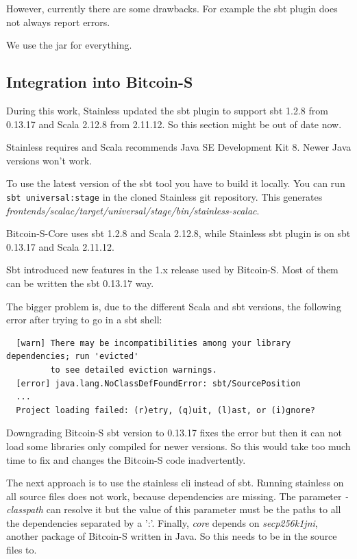\documentclass[runningheads]{llncs}
\begin{document}
However, currently there are some drawbacks.  For example the sbt
plugin does not always report errors.

We use the jar for everything. 

\subsection{Integration into Bitcoin-S}

During this work, Stainless updated the sbt plugin to support sbt
1.2.8 from 0.13.17 and Scala 2.12.8 from 2.11.12.  So this section
might be out of date now.

Stainless requires and Scala recommends Java SE Development Kit 8.
Newer Java versions won't work.

To use the latest version of the sbt tool you have to build it
locally.  You can run \texttt{sbt universal:stage} in the cloned
Stainless git repository.  This generates
\emph{frontends/scalac/target/universal/stage/bin/stainless-scalac}.

Bitcoin-S-Core uses sbt 1.2.8 and Scala 2.12.8, while Stainless sbt
plugin is on sbt 0.13.17 and Scala 2.11.12.

Sbt introduced new features in the 1.x release used by Bitcoin-S.
Most of them can be written the sbt 0.13.17 way.

The bigger problem is, due to the different Scala and sbt versions,
the following error after trying to go in a sbt shell:
\begin{verbatim}
  [warn] There may be incompatibilities among your library dependencies; run 'evicted'
         to see detailed eviction warnings.
  [error] java.lang.NoClassDefFoundError: sbt/SourcePosition
  ...
  Project loading failed: (r)etry, (q)uit, (l)ast, or (i)gnore?
\end{verbatim}

Downgrading Bitcoin-S sbt version to 0.13.17 fixes the error but then
it can not load some libraries only compiled for newer versions.  So
this would take too much time to fix and changes the Bitcoin-S code
inadvertently.

The next approach is to use the stainless cli instead of sbt.  Running
stainless on all source files does not work, because dependencies are
missing.  The parameter \emph{-classpath} can resolve it but the value
of this parameter must be the paths to all the dependencies separated
by a ':'.  Finally, \emph{core} depends on \emph{secp256k1jni},
another package of Bitcoin-S written in Java.  So this needs to be in
the source files to.
\end{document}
